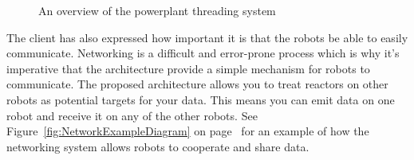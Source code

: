 \documentclass[english,12pt]{scrartcl}
\begin{document}
\begin{landscape}
\begin{figure}[b]
				\caption {An overview of the \gls{powerplant} threading system}
				\label{fig:PowerPlantThreadingOverviewDiagram}
			\end{figure}
			\end{landscape}

			The client has also expressed how important it is that the robots be able to easily
			communicate. Networking is a difficult and error-prone process which is why it's
			imperative that the architecture provide a simple mechanism for robots to communicate.
			The proposed architecture allows you to treat \glspl{reactor} on other robots as potential
			targets for your data. This means you can emit data on one robot and receive it on any
			of the other robots. See Figure~\ref{fig:NetworkExampleDiagram} on
			page~\pageref{fig:NetworkExampleDiagram} for an example of how the networking system
			allows robots to cooperate and share data.
\end{document}
